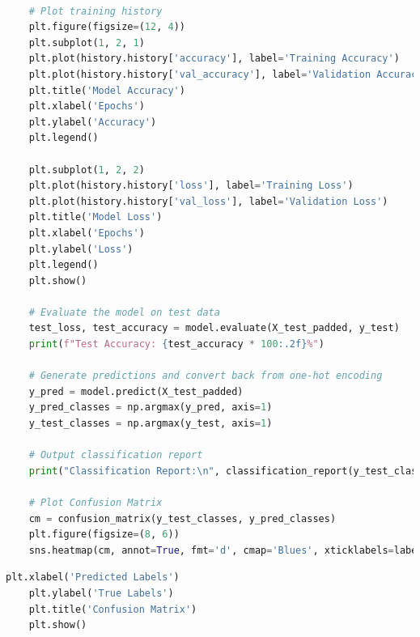 \begin{tcolorbox}[colback=gray!5!white, colframe=gray!80!black, boxrule=0.5pt, title=LSTM Model Implementation]
    \begin{lstlisting}[language=Python]

    # Plot training history
    plt.figure(figsize=(12, 4))
    plt.subplot(1, 2, 1)
    plt.plot(history.history['accuracy'], label='Training Accuracy')
    plt.plot(history.history['val_accuracy'], label='Validation Accuracy')
    plt.title('Model Accuracy')
    plt.xlabel('Epochs')
    plt.ylabel('Accuracy')
    plt.legend()

    plt.subplot(1, 2, 2)
    plt.plot(history.history['loss'], label='Training Loss')
    plt.plot(history.history['val_loss'], label='Validation Loss')
    plt.title('Model Loss')
    plt.xlabel('Epochs')
    plt.ylabel('Loss')
    plt.legend()
    plt.show()

    # Evaluate the model on test data
    test_loss, test_accuracy = model.evaluate(X_test_padded, y_test)
    print(f"Test Accuracy: {test_accuracy * 100:.2f}%")

    # Generate predictions and convert back from one-hot encoding
    y_pred = model.predict(X_test_padded)
    y_pred_classes = np.argmax(y_pred, axis=1)
    y_test_classes = np.argmax(y_test, axis=1)

    # Output classification report
    print("Classification Report:\n", classification_report(y_test_classes, y_pred_classes, target_names=label_encoder.classes_))

    # Plot Confusion Matrix
    cm = confusion_matrix(y_test_classes, y_pred_classes)
    plt.figure(figsize=(8, 6))
    sns.heatmap(cm, annot=True, fmt='d', cmap='Blues', xticklabels=label_encoder.classes_, yticklabels=label_encoder.classes_)

\end{lstlisting}
\end{tcolorbox}

\begin{tcolorbox}[colback=gray!5!white, colframe=gray!80!black, boxrule=0.5pt, title=LSTM Model Implementation]
    \begin{lstlisting}[language=Python]
    plt.xlabel('Predicted Labels')
    plt.ylabel('True Labels')
    plt.title('Confusion Matrix')
    plt.show()
    \end{lstlisting}
\end{tcolorbox}

